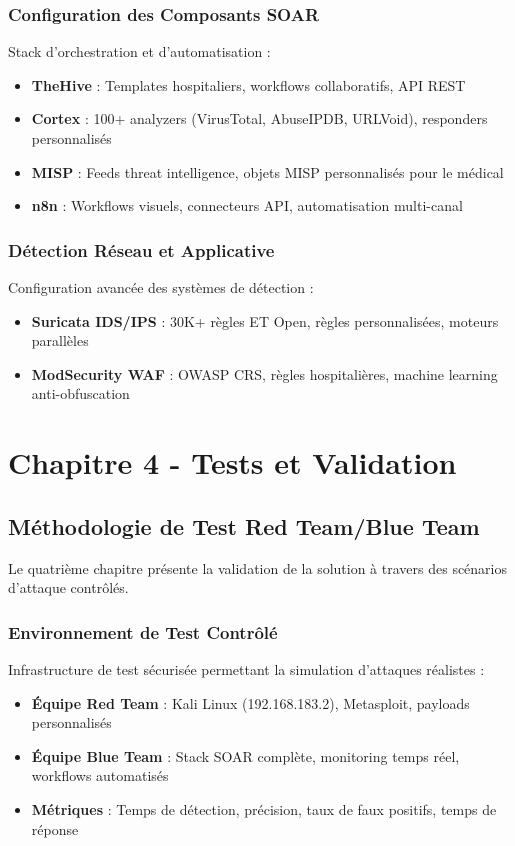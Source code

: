 \subsubsection{Configuration des Composants SOAR}
Stack d'orchestration et d'automatisation :
\begin{itemize}
    \item \textbf{TheHive} : Templates hospitaliers, workflows collaboratifs, API REST
    \item \textbf{Cortex} : 100+ analyzers (VirusTotal, AbuseIPDB, URLVoid), responders personnalisés
    \item \textbf{MISP} : Feeds threat intelligence, objets MISP personnalisés pour le médical
    \item \textbf{n8n} : Workflows visuels, connecteurs API, automatisation multi-canal
\end{itemize}

\subsubsection{Détection Réseau et Applicative}
Configuration avancée des systèmes de détection :
\begin{itemize}
    \item \textbf{Suricata IDS/IPS} : 30K+ règles ET Open, règles personnalisées, moteurs parallèles
    \item \textbf{ModSecurity WAF} : OWASP CRS, règles hospitalières, machine learning anti-obfuscation
\end{itemize}

\section{Chapitre 4 - Tests et Validation}

\subsection{Méthodologie de Test Red Team/Blue Team}

Le quatrième chapitre présente la validation de la solution à travers des scénarios d'attaque contrôlés.

\subsubsection{Environnement de Test Contrôlé}
Infrastructure de test sécurisée permettant la simulation d'attaques réalistes :
\begin{itemize}
    \item \textbf{Équipe Red Team} : Kali Linux (192.168.183.2), Metasploit, payloads personnalisés
    \item \textbf{Équipe Blue Team} : Stack SOAR complète, monitoring temps réel, workflows automatisés
    \item \textbf{Métriques} : Temps de détection, précision, taux de faux positifs, temps de réponse
\end{itemize}

